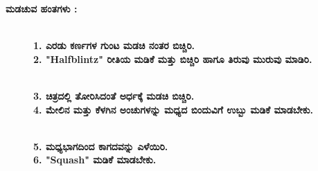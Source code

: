 \noindent
\textbf{ಮಡಚುವ ಹಂತಗಳು :}
\begin{figure}[H]
\\
\textbf{1. ಎರಡು ಕರ್ಣಗಳ ಗುಂಟ ಮಡಚಿ ನಂತರ ಬಿಚ್ಚಿರಿ.}\\
\textbf{2. "Halfblintz" ರೀತಿಯ ಮಡಿಕೆ ಮತ್ತು ಬಿಚ್ಚಿರಿ ಹಾಗೂ ತಿರುವು ಮುರುವು ಮಾಡಿರಿ.}
\end{figure}
\begin{figure}[H]
\\
\textbf{3. ಚಿತ್ರದಲ್ಲಿ ತೋರಿಸಿದಂತೆ ಅರ್ಧಕ್ಕೆ ಮಡಚಿ ಬಿಚ್ಚಿರಿ.}\\
\textbf{4. ಮೇಲಿನ ಮತ್ತು ಕೆಳಗಿನ ಅಂಚುಗಳನ್ನು ಮಧ್ಯದ ಬಿಂದುವಿಗೆ ಉಬ್ಬು ಮಡಿಕೆ ಮಾಡಬೇಕು.}
\end{figure}
\begin{figure}[H]
\\
\textbf{5. ಮಧ್ಯಭಾಗದಿಂದ ಕಾಗದವನ್ನು ಎಳೆಯಿರಿ.}\\
\textbf{6. "Squash" ಮಡಿಕೆ ಮಾಡಬೇಕು.}
\end{figure}
